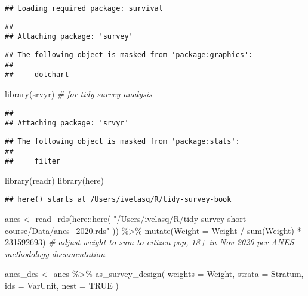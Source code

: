 \documentclass[
]{krantz}
\makeatletter
\newenvironment{Shaded}{\begin{snugshade}}{\end{snugshade}}
\newcommand{\AttributeTok}[1]{\textcolor[rgb]{0.61,0.61,0.61}{#1}}
\newcommand{\CommentTok}[1]{\textcolor[rgb]{0.37,0.37,0.37}{\textit{#1}}}
\newcommand{\ConstantTok}[1]{\textcolor[rgb]{0,0,0}{#1}}
\newcommand{\DecValTok}[1]{\textcolor[rgb]{0.06,0.06,0.06}{#1}}
\newcommand{\FunctionTok}[1]{\textcolor[rgb]{0,0,0}{#1}}
\newcommand{\NormalTok}[1]{#1}
\newcommand{\OtherTok}[1]{\textcolor[rgb]{0.37,0.37,0.37}{#1}}
\newcommand{\SpecialCharTok}[1]{\textcolor[rgb]{0,0,0}{#1}}
\newcommand{\StringTok}[1]{\textcolor[rgb]{0.5,0.5,0.5}{#1}}
\newenvironment{kframe}{%
\medskip{}
\setlength{\fboxsep}{.8em}
 \def\at@end@of@kframe{}%
 \ifinner\ifhmode%
  \def\at@end@of@kframe{\end{minipage}}%
  \begin{minipage}{\columnwidth}%
 \fi\fi%
 \def\FrameCommand##1{\hskip\@totalleftmargin \hskip-\fboxsep
 \colorbox{shadecolor}{##1}\hskip-\fboxsep
     \hskip-\linewidth \hskip-\@totalleftmargin \hskip\columnwidth}%
 \MakeFramed {\advance\hsize-\width
   \@totalleftmargin\z@ \linewidth\hsize
   \@setminipage}}%
 {\par\unskip\endMakeFramed%
 \at@end@of@kframe}
\renewenvironment{Shaded}{\begin{kframe}}{\end{kframe}}
\makeatother
\begin{document}
\begin{verbatim}
## Loading required package: survival
\end{verbatim}

\begin{verbatim}
## 
## Attaching package: 'survey'
\end{verbatim}

\begin{verbatim}
## The following object is masked from 'package:graphics':
## 
##     dotchart
\end{verbatim}

\begin{Shaded}
\begin{Highlighting}[]
\FunctionTok{library}\NormalTok{(srvyr) }\CommentTok{\# for tidy survey analysis}
\end{Highlighting}
\end{Shaded}

\begin{verbatim}
## 
## Attaching package: 'srvyr'
\end{verbatim}

\begin{verbatim}
## The following object is masked from 'package:stats':
## 
##     filter
\end{verbatim}

\begin{Shaded}
\begin{Highlighting}[]
\FunctionTok{library}\NormalTok{(readr)}
\FunctionTok{library}\NormalTok{(here)}
\end{Highlighting}
\end{Shaded}

\begin{verbatim}
## here() starts at /Users/ivelasq/R/tidy-survey-book
\end{verbatim}

\begin{Shaded}
\begin{Highlighting}[]
\NormalTok{anes }\OtherTok{\textless{}{-}}
  \FunctionTok{read\_rds}\NormalTok{(here}\SpecialCharTok{::}\FunctionTok{here}\NormalTok{(}
    \StringTok{"/Users/ivelasq/R/tidy{-}survey{-}short{-}course/Data/anes\_2020.rds"}
\NormalTok{  )) }\SpecialCharTok{\%\textgreater{}\%}
  \FunctionTok{mutate}\NormalTok{(}\AttributeTok{Weight =}\NormalTok{ Weight }\SpecialCharTok{/} \FunctionTok{sum}\NormalTok{(Weight) }\SpecialCharTok{*} \DecValTok{231592693}\NormalTok{) }
\CommentTok{\# adjust weight to sum to citizen pop, 18+ in Nov 2020 per ANES methodology documentation}

\NormalTok{anes\_des }\OtherTok{\textless{}{-}}\NormalTok{ anes }\SpecialCharTok{\%\textgreater{}\%}
  \FunctionTok{as\_survey\_design}\NormalTok{(}
    \AttributeTok{weights =}\NormalTok{ Weight,}
    \AttributeTok{strata =}\NormalTok{ Stratum,}
    \AttributeTok{ids =}\NormalTok{ VarUnit,}
    \AttributeTok{nest =} \ConstantTok{TRUE}
\NormalTok{  )}
\end{Highlighting}
\end{Shaded}
\end{document}
